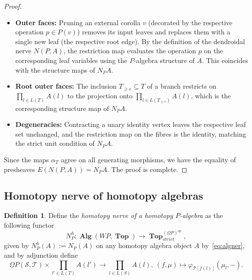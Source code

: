 \documentclass{amsart}
\theoremstyle{definition}
\newtheorem{definition}[formula]{Definition}
\theoremstyle{remark}
\DeclareMathOperator{\Top}{\mathbf{Top}}
\DeclareMathOperator{\Alg}{\mathbf{Alg}}
\renewcommand{\phi}{\varphi}
\begin{document}
\begin{proof}
\begin{itemize}
		\item \textbf{Outer faces:} Pruning an external corolla $v$ (decorated by the respective operation $p \in P(v)$) removes its input leaves and replaces them with a single new leaf (the respective root edge). 
		By the definition of the dendroidal nerve $N(P,A)$, the restriction map evaluates the operation $p$ on the corresponding leaf variables using the $P$-algebra structure of $A$. 
		This coincides with the structure maps of $N_P A$.
		
		\item \textbf{Root outer faces:} The inclusion $T_{\geqslant e}\subseteq T$ of a
		branch restricts on $\prod_{l\in L(T)}A(l)$ to the projection onto
		$\prod_{l\in L(T_{\geqslant e})}A(l)$, which is the corresponding structure
		map of $N_PA$.
		\item \textbf{Degeneracies:} Contracting a unary identity vertex leaves the
		respective leaf set unchanged, and the restriction map on the fibres is the
		identity, matching the strict unit condition of $N_PA$.

		\end{itemize}
		Since the maps $\alpha_{T}$ agree on all generating morphisms, we have the equality of presheaves $E(N(P, A)) = N_P A$.
		The proof is complete.
	\end{proof}	
		
	\subsection{Homotopy nerve of homotopy algebras}
	
	\begin{definition}\label{def:nhp}
		Define the \emph{homotopy nerve of a homotopy $P$-algebra} as the following functor
		\[
			N^{h}_{P}\colon 	\Alg(WP,\Top)\to 	\Top^{(\underline{\Omega} P)^{op}}_{strict},
		\]
		given by $N^{h}_{P}(A):=N_{P}(A)$ on any homotopy algebra object $A$ by~\eqref{eq:algner}, and by adjunction define 
		\[
			\underline{\Omega} P(\mathcal{S},\mathcal{T})\times 
			\prod_{l'\in L(T)} A(l')\to 
			\prod_{l\in L(S)} A(l),\ 
			(f,\mu)\mapsto \phi_{\mathcal{T}[f(l)]}(\mu_{l},-).
		\]
	\end{definition}
	
\end{document}
